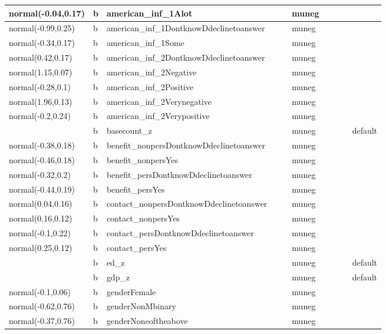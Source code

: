 \documentclass[
]{book}
\theoremstyle{definition}
\theoremstyle{definition}
\theoremstyle{definition}
\theoremstyle{definition}
\theoremstyle{remark}
\begin{document}
\begin{table}
\begin{tabular}[t]{l|l|l|l|l|l|l|l|l|l}
normal(-0.04,0.17) & b & american\_inf\_1Alot &  &  & muneg &  &  &  & \\
\hline
normal(-0.99,0.25) & b & american\_inf\_1DontknowDdeclinetoanswer &  &  & muneg &  &  &  & \\
\hline
normal(-0.34,0.17) & b & american\_inf\_1Some &  &  & muneg &  &  &  & \\
\hline
normal(0.42,0.17) & b & american\_inf\_2DontknowDdeclinetoanswer &  &  & muneg &  &  &  & \\
\hline
normal(1.15,0.07) & b & american\_inf\_2Negative &  &  & muneg &  &  &  & \\
\hline
normal(-0.28,0.1) & b & american\_inf\_2Positive &  &  & muneg &  &  &  & \\
\hline
normal(1.96,0.13) & b & american\_inf\_2Verynegative &  &  & muneg &  &  &  & \\
\hline
normal(-0.2,0.24) & b & american\_inf\_2Verypositive &  &  & muneg &  &  &  & \\
\hline
 & b & basecount\_z &  &  & muneg &  &  &  & default\\
\hline
normal(-0.38,0.18) & b & benefit\_nonpersDontknowDdeclinetoanswer &  &  & muneg &  &  &  & \\
\hline
normal(-0.46,0.18) & b & benefit\_nonpersYes &  &  & muneg &  &  &  & \\
\hline
normal(-0.32,0.2) & b & benefit\_persDontknowDdeclinetoanswer &  &  & muneg &  &  &  & \\
\hline
normal(-0.44,0.19) & b & benefit\_persYes &  &  & muneg &  &  &  & \\
\hline
normal(0.04,0.16) & b & contact\_nonpersDontknowDdeclinetoanswer &  &  & muneg &  &  &  & \\
\hline
normal(0.16,0.12) & b & contact\_nonpersYes &  &  & muneg &  &  &  & \\
\hline
normal(-0.1,0.22) & b & contact\_persDontknowDdeclinetoanswer &  &  & muneg &  &  &  & \\
\hline
normal(0.25,0.12) & b & contact\_persYes &  &  & muneg &  &  &  & \\
\hline
 & b & ed\_z &  &  & muneg &  &  &  & default\\
\hline
 & b & gdp\_z &  &  & muneg &  &  &  & default\\
\hline
normal(-0.1,0.06) & b & genderFemale &  &  & muneg &  &  &  & \\
\hline
normal(-0.62,0.76) & b & genderNonMbinary &  &  & muneg &  &  &  & \\
\hline
normal(-0.37,0.76) & b & genderNoneoftheabove &  &  & muneg &  &  &  & \\

\end{tabular}
\end{table}
\end{document}
